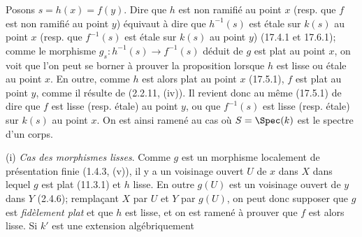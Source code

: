 Posons $s=h(x)=f(y)$. Dire que $h$ est non ramifié au point $x$ (resp. que $f$ est non ramifié au point $y$) équivaut à dire que $h^{-1}(s)$ est étale sur $k(s)$ au point $x$ (resp. que $f^{-1}(s)$ est étale sur $k(s)$ au point $y$) (17.4.1 et 17.6.1); comme le morphisme $g_s:h^{-1}(s)\to f^{-1}(s)$ déduit de $g$ est plat au point $x$, on voit que l'on peut se borner à prouver la proposition lorsque $h$ est lisse ou étale au point $x$. En outre, comme $h$ est alors plat au point $x$ (17.5.1), $f$ est plat au point $y$, comme il résulte de (2.2.11, (iv)). Il revient donc au même (17.5.1) de dire que $f$ est lisse (resp. étale) au point $y$, ou que $f^{-1}(s)$ est lisse (resp. étale) sur $k(s)$ au point $x$. On est ainsi ramené au cas où $S=\Spec(k)$ est le spectre d'un corps.

(i) \emph{Cas des morphismes lisses}. Comme $g$ est un morphisme localement de présentation finie (1.4.3, (v)), il y a un voisinage ouvert $U$ de $x$ dans $X$ dans lequel $g$ est plat (11.3.1) et $h$ lisse. En outre $g(U)$ est un voisinage ouvert de $y$ dans $Y$ (2.4.6); remplaçant $X$ par $U$ et $Y$ par $g(U)$, on peut donc supposer que $g$ est \emph{fidèlement plat} et que $h$ est lisse, et on est ramené à prouver que $f$ est alors lisse. Si $k'$ est une extension algébriquement

